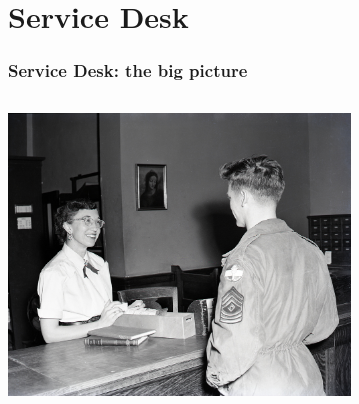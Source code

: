 \documentclass{beamer}
\begin{document}
\section{Service Desk}

\begin{frame}
\frametitle{Service Desk: the big picture}
\begin{columns}
\begin{column}{0.45\textwidth}
\includegraphics[height=7.5cm]{./pics/servicedesk.jpg}
\end{column}
\begin{column}{0.45\textwidth}
\end{column}
\end{columns}
\end{frame}
\end{document}
